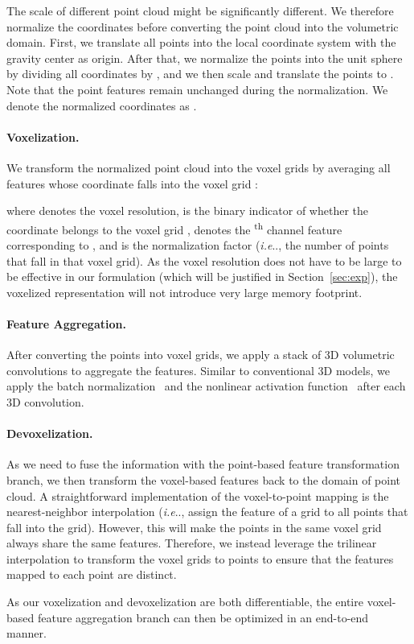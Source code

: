 \documentclass{article}
\makeatletter
\newcommand{\sect}[1]{Section~\ref{#1}}
\DeclareRobustCommand\onedot{\futurelet\@let@token\@onedot}
\def\@onedot{\ifx\@let@token.\else.\null\fi\xspace}
\def\ie{\emph{i.e}\onedot} \def\Ie{\emph{I.e}\onedot}
\newcommand{\myparagraph}[1]{\vspace{-6pt}\paragraph{#1}}
\makeatother
\begin{document}
The scale of different point cloud might be significantly different. We therefore normalize the coordinates  before converting the point cloud into the volumetric domain. First, we translate all points into the local coordinate system with the gravity center as origin. After that, we normalize the points into the unit sphere by dividing all coordinates by , and we then scale and translate the points to . Note that the point features  remain unchanged during the normalization. We denote the normalized coordinates as .

\myparagraph{Voxelization.}

We transform the normalized point cloud  into the voxel grids  by averaging all features  whose coordinate  falls into the voxel grid :

where  denotes the voxel resolution,  is the binary indicator of whether the coordinate  belongs to the voxel grid ,  denotes the \textsuperscript{th} channel feature corresponding to , and  is the normalization factor (\ie, the number of points that fall in that voxel grid). As the voxel resolution  does not have to be large to be effective in our formulation (which will be justified in \sect{sec:exp}), the voxelized representation will not introduce very large memory footprint.

\myparagraph{Feature Aggregation.}

After converting the points into voxel grids, we apply a stack of 3D volumetric convolutions to aggregate the features. Similar to conventional 3D models, we apply the batch normalization~\cite{Ioffe:2015bn} and the nonlinear activation function~\cite{Maas:2013re} after each 3D convolution.

\myparagraph{Devoxelization.}

As we need to fuse the information with the point-based feature transformation branch, we then transform the voxel-based features back to the domain of point cloud. A straightforward implementation of the voxel-to-point mapping is the nearest-neighbor interpolation (\ie, assign the feature of a grid to all points that fall into the grid). However, this will make the points in the same voxel grid always share the same features. Therefore, we instead leverage the trilinear interpolation to transform the voxel grids to points to ensure that the features mapped to each point are distinct.

As our voxelization and devoxelization are both differentiable, the entire voxel-based feature aggregation branch can then be optimized in an end-to-end manner.
\end{document}

